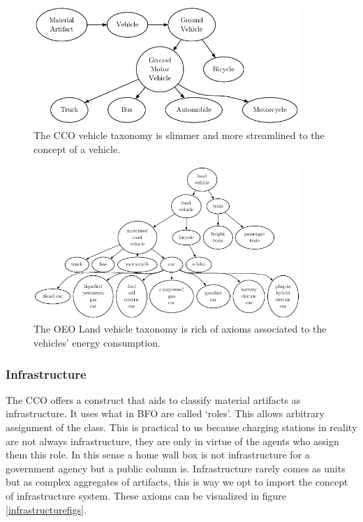 \begin{figure}[h]
    \centering
    \includegraphics[width=0.9\textwidth]{images/CCOVehicles}
    \caption{The CCO vehicle taxonomy is slimmer and more streamlined to the concept of a vehicle.}
    \label{ccovectax}
\end{figure}
\begin{figure}[h]
    
    \centering
    \includegraphics[width=0.9\textwidth]{images/OEOLVehicles}
    \caption{The OEO Land vehicle taxonomy is rich of axioms associated to the vehicles' energy consumption.}
    \label{landvehicletaxoeo}
\end{figure}

\subsubsection{Infrastructure}

The CCO offers a construct that aids to classify material artifacts as
infrastructure. It uses what in BFO are called `roles'. This allows arbitrary
assignment of the class. This is practical to us because charging stations in
reality are not always infrastructure, they are only in virtue of the agents
who assign them this role. In this sense a home wall box is not infrastructure
for a government agency but a public column is. Infrastructure rarely comes as
units but as  complex aggregates of artifacts, this is way we opt to import the
concept of infrastructure system. These axioms can be visualized in figure
\ref{infrastructurefigs}.

